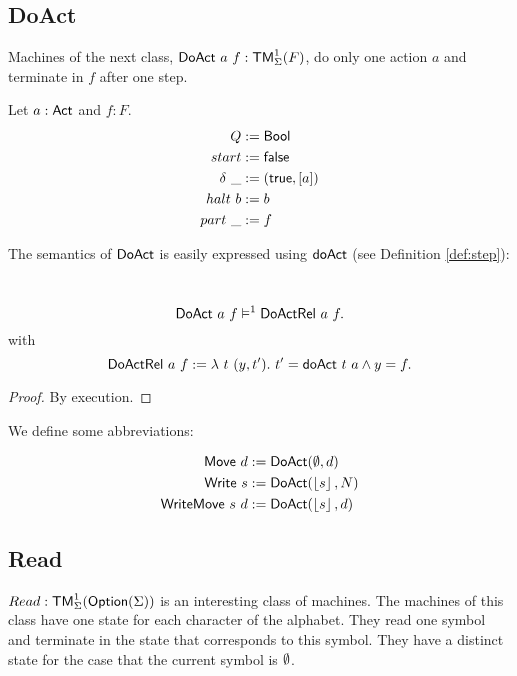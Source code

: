 \subsection{DoAct}
\label{sec:DoAct}

Machines of the next class, $\textsf{DoAct}~a~f : \textsf{TM}_\Sigma^1(F)$, do only one action $a$ and terminate in $f$ after one step.
\begin{definition}[$\MS{DoAct}~a~f$]
  \label{def:DoAct}
  Let $a:\textsf{Act}$ and $f:F$.
  \begin{align*}
    Q          &:= \textsf{Bool} \\
    start      &:= \textsf{false} \\
    \delta ~\_ &:= (\textsf{true}, \left[ a \right]) \\
    halt   ~ b &:= b \\
    part   ~\_ &:= f
  \end{align*}
\end{definition}
The semantics of $\textsf{DoAct}$ is easily expressed using $\textsf{doAct}$ (see Definition \ref{def:step}):
\begin{lemma}
  \label{lem:tam}
  ~
  \[
    \textsf{DoAct}~a~f \vDash^1 \textsf{DoActRel}~a~f.
  \]
  with
  \[
    \textsf{DoActRel}~a~f := \lambda~t~(y, t').~ t' = \textsf{doAct}~t~a \land y = f.
  \]
\end{lemma}
\begin{proof}
  By execution.
\end{proof}


We define some abbreviations:

\begin{definition}
 \label{def:DoAct-derived} 

 \begin{align*}
   \textsf{Move}       ~d &:= \textsf{DoAct} (\emptyset, d) \\
   \textsf{Write}    ~s   &:= \textsf{DoAct} (\left\lfloor {s} \right\rfloor, N) \\
   \textsf{WriteMove}~s~d &:= \textsf{DoAct} (\left\lfloor {s} \right\rfloor, d)
 \end{align*}
 
\end{definition}



\subsection{Read}
\label{sec:basic_machines-Read}

$Read : \textsf{TM}_\Sigma^1(\textsf{Option}(\Sigma))$ is an interesting class of machines.  The machines of this class have one state for each character of the
alphabet.  They read one symbol and terminate in the state that corresponds to this symbol.  They have a distinct state for the case that the current
symbol is $\emptyset$.


